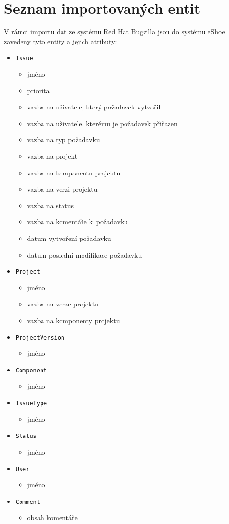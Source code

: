 \documentclass[11pt,oneside]{fithesis2}
\begin{document}
\chapter{Seznam importovaných entit}
\label{PrilohaSeznamEntit}
V rámci importu dat ze systému Red Hat Bugzilla jsou do systému eShoe zavedeny tyto entity a jejich atributy:
\begin{itemize}
	\item \texttt{Issue}
		\begin{itemize}
			\item jméno
			\item priorita
			\item vazba na uživatele, který požadavek vytvořil
			\item vazba na uživatele, kterému je požadavek přiřazen
			\item vazba na typ požadavku
			\item vazba na projekt
			\item vazba na komponentu projektu
			\item vazba na verzi projektu
			\item vazba na status
			\item vazba na komentáře k~požadavku
			\item datum vytvoření požadavku
			\item datum poslední modifikace požadavku
		\end{itemize}
	\item \texttt{Project}
		\begin{itemize}
			\item jméno
			\item vazba na verze projektu
			\item vazba na komponenty projektu			
		\end{itemize}
	\item \texttt{ProjectVersion}
		\begin{itemize}
			\item jméno				
		\end{itemize}
	\item \texttt{Component}
		\begin{itemize}
			\item jméno
		\end{itemize}
	\item \texttt{IssueType}
		\begin{itemize}
			\item jméno
		\end{itemize}
	\item \texttt{Status}
		\begin{itemize}
			\item jméno
		\end{itemize}
	\item \texttt{User}
		\begin{itemize}
			\item jméno
		\end{itemize}
	\item \texttt{Comment}
		\begin{itemize}
			\item obsah komentáře
		\end{itemize}
\end{itemize}
\end{document}
